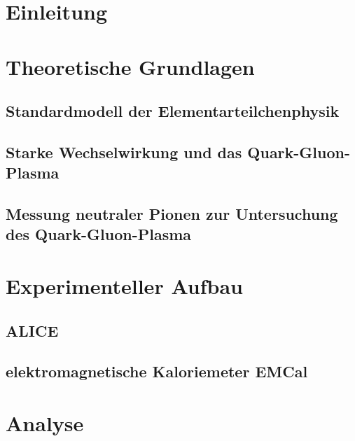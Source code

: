 \documentclass[11pt]{article}
\author{Marvin Hemmer}
\begin{document}
\begin{titlepage}
\begin{center}

\end{center}
\end{titlepage}
\newpage
\tableofcontents
\newpage

\section*{Einleitung}

\section{Theoretische Grundlagen} \label{s1}
\subsection{Standardmodell der Elementarteilchenphysik} \label{s1s1}

\subsection{Starke Wechselwirkung und das Quark-Gluon-Plasma} \label{s1s2}

\subsection{Messung neutraler Pionen zur Untersuchung des Quark-Gluon-Plasma} \label{s1s3}


\section{Experimenteller Aufbau} \label{s2}
\subsection{ALICE} \label{s2s1}
\subsection{elektromagnetische Kaloriemeter EMCal} \label{s2s2}

\section{Analyse} \label{s3}
\end{document}

